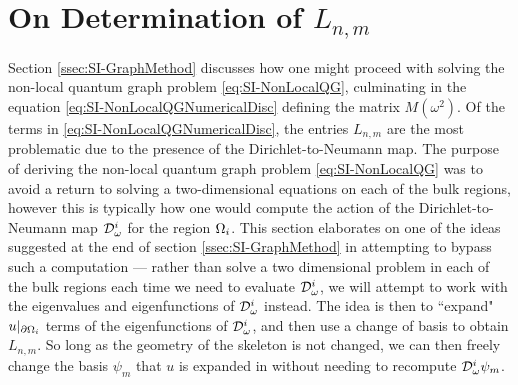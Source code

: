 \section{On Determination of $L_{n,m}$} \label{sec:SIApp-NonLocalSolve}
Section \ref{ssec:SI-GraphMethod} discusses how one might proceed with solving the non-local quantum graph problem \eqref{eq:SI-NonLocalQG}, culminating in the equation \ref{eq:SI-NonLocalQGNumericalDisc} defining the matrix $M(\omega^2)$.
Of the terms in \eqref{eq:SI-NonLocalQGNumericalDisc}, the entries $L_{n,m}$ are the most problematic due to the presence of the Dirichlet-to-Neumann map.
The purpose of deriving the non-local quantum graph problem \eqref{eq:SI-NonLocalQG} was to avoid a return to solving a two-dimensional equations on each of the bulk regions, however this is typically how one would compute the action of the Dirichlet-to-Neumann map $\mathcal{D}_\omega^i$ for the region $\Omega_i$.
This section elaborates on one of the ideas suggested at the end of section \ref{ssec:SI-GraphMethod} in attempting to bypass such a computation --- rather than solve a two dimensional problem in each of the bulk regions each time we need to evaluate $\mathcal{D}_\omega^i$, we will attempt to work with the eigenvalues and eigenfunctions of $\mathcal{D}_\omega^i$ instead.
The idea is then to ``expand" $u\vert_{\partial\Omega_i}$ terms of the eigenfunctions of $\mathcal{D}_{\omega}^i$, and then use a change of basis to obtain $L_{n,m}$.
So long as the geometry of the skeleton is not changed, we can then freely change the basis $\psi_m$ that $u$ is expanded in without needing to recompute $\mathcal{D}_\omega^i\psi_m$.

